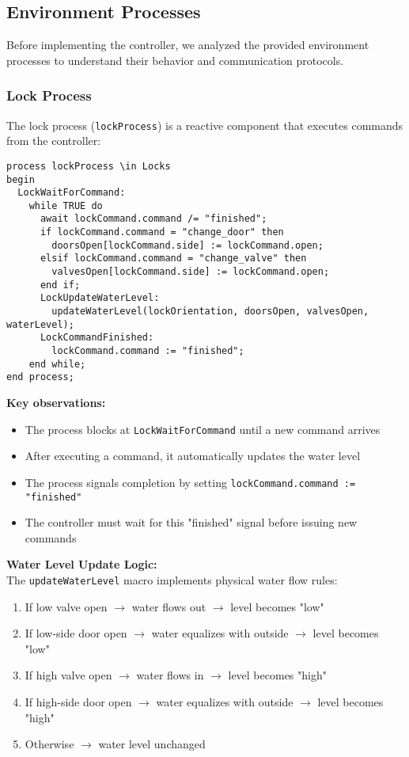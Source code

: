 \documentclass[12pt,a4paper]{article}
\begin{document}
\subsection{Environment Processes}

Before implementing the controller, we analyzed the provided environment processes to understand their behavior and communication protocols.

\subsubsection{Lock Process}

The lock process (\texttt{lockProcess}) is a reactive component that executes commands from the controller:

\begin{lstlisting}[style=tlaplus, caption={Lock Process Structure}]
process lockProcess \in Locks
begin
  LockWaitForCommand:
    while TRUE do
      await lockCommand.command /= "finished";
      if lockCommand.command = "change_door" then
        doorsOpen[lockCommand.side] := lockCommand.open;
      elsif lockCommand.command = "change_valve" then
        valvesOpen[lockCommand.side] := lockCommand.open;
      end if;
      LockUpdateWaterLevel:
        updateWaterLevel(lockOrientation, doorsOpen, valvesOpen, waterLevel);
      LockCommandFinished:
        lockCommand.command := "finished";
    end while;
end process;
\end{lstlisting}

\textbf{Key observations:}
\begin{itemize}
    \item The process blocks at \texttt{LockWaitForCommand} until a new command arrives
    \item After executing a command, it automatically updates the water level
    \item The process signals completion by setting \texttt{lockCommand.command := "finished"}
    \item The controller must wait for this "finished" signal before issuing new commands
\end{itemize}

\textbf{Water Level Update Logic:}\\
The \texttt{updateWaterLevel} macro implements physical water flow rules:
\begin{enumerate}
    \item If low valve open $\rightarrow$ water flows out $\rightarrow$ level becomes "low"
    \item If low-side door open $\rightarrow$ water equalizes with outside $\rightarrow$ level becomes "low"
    \item If high valve open $\rightarrow$ water flows in $\rightarrow$ level becomes "high"
    \item If high-side door open $\rightarrow$ water equalizes with outside $\rightarrow$ level becomes "high"
    \item Otherwise $\rightarrow$ water level unchanged
\end{enumerate}
\end{document}
